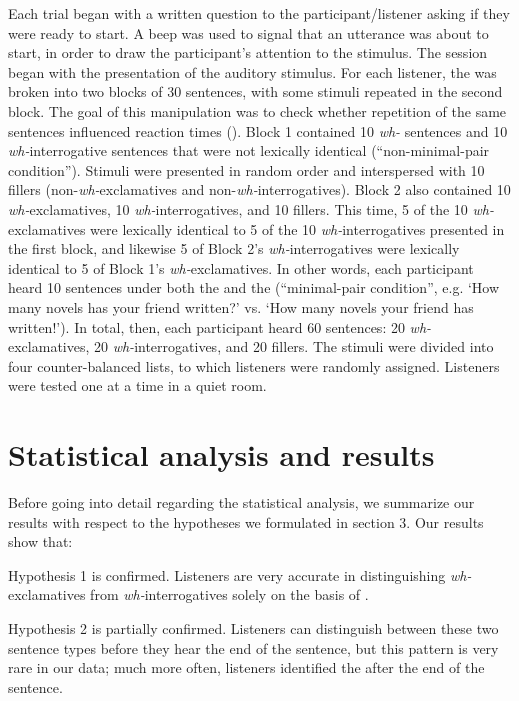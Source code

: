 \documentclass[output=paper]{langsci/langscibook}
\begin{document}
Each trial began with a written question to the participant/listener asking if they were ready to start. A beep was used to signal that an utterance was about to start, in order to draw the participant’s attention to the stimulus. The session began with the presentation of the auditory stimulus. For each listener, the  was broken into two blocks of 30 sentences, with some stimuli repeated in the second block. The goal of this manipulation was to check whether repetition of the same sentences influenced reaction times (\citealt{Bentin1994}). Block 1 contained 10 \textit{wh-} sentences and 10 \textit{wh-}interrogative sentences that were not lexically identical (“non-minimal-pair condition”). Stimuli were presented in random order and interspersed with 10 fillers (non-\textit{wh-}exclamatives and non-\textit{wh-}interrogatives). Block 2 also contained 10 \textit{wh-}excla\-ma\-tives, 10 \textit{wh-}interrogatives, and 10 fillers. This time, 5 of the 10 \textit{wh-}exclamatives were lexically identical to 5 of the 10 \textit{wh-}interrogatives presented in the first block, and likewise 5 of Block 2’s \textit{wh-}interrogatives were lexically identical to 5 of Block 1’s \textit{wh-}exclamatives. In other words, each participant heard 10 sentences under both the  and the  (“minimal-pair condition”, e.g. ‘How many novels has your friend written?’ vs. ‘How many novels your friend has written!’). In total, then, each participant heard 60 sentences: 20 \textit{wh-}exclamatives, 20 \textit{wh-}interrogatives, and 20 fillers. The stimuli were divided into four counter-balanced lists, to which listeners were randomly assigned. Listeners were tested one at a time in a quiet room. 


\section{Statistical analysis and results}
\label{sec:kel:5}

Before going into detail regarding the statistical analysis, we summarize our results with respect to the hypotheses we formulated in section 3. Our results show that:

Hypothesis 1 is confirmed. Listeners are very accurate in distinguishing \textit{wh-}exclamatives from \textit{wh-}interrogatives solely on the basis of . 

Hypothesis 2 is partially confirmed. Listeners can distinguish between these two sentence types before they hear the end of the sentence, but this pattern is very rare in our data; much more often, listeners identified the  after the end of the sentence. 
\end{document}
